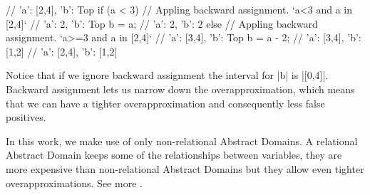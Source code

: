 \begin{pythoncode}
// {'a': [2,4], 'b': Top}
if (a < 3) {
  // Appling backward assignment. `a<3 and a in [2,4]`
  // {'a': 2, 'b': Top}
  b = a;
  // {'a': 2, 'b': 2}
} else {
  // Appling backward assignment. `a>=3 and a in [2,4]`
  // {'a': [3,4], 'b': Top}
  b = a - 2;
  // {'a': [3,4], 'b': [1,2]}
}
// {'a': [2,4], 'b': [1,2]}
\end{pythoncode}

Notice that if we ignore backward assignment the interval for \pycode|b|
is \pycode|[0,4]|. Backward assignment lets us narrow down the
overapproximation, which means that we can have a tighter
overapproximation and consequently less false positives.

In this work, we make use of only non-relational Abstract Domains. A
relational Abstract Domain keeps some of the relationships between
variables, they are more expensive than non-relational Abstract Domains
but they allow even tighter overapproximations. See more
\textcite{mine_weakly_2004}.
